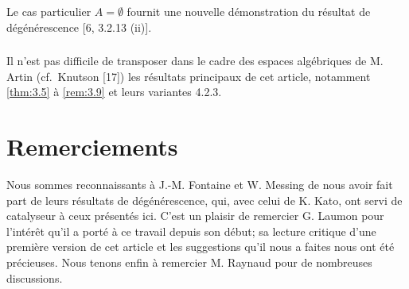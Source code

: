 \documentclass[12pt,a4paper]{article}
\theoremstyle{plain}
\theoremstyle{definition}
\theoremstyle{remark}
\begin{document}
Le cas particulier $A = \emptyset$ fournit une nouvelle d\'emonstration du r\'esultat de d\'eg\'en\'erescence [6, 3.2.13 (ii)].

\subsubsection{}

Il n'est pas difficile de transposer dans le cadre des espaces alg\'ebriques de M. Artin (cf.~Knutson [17]) les r\'esultats principaux de cet article, notamment \ref{thm:3.5} \`a \ref{rem:3.9} et leurs variantes 4.2.3.

\section*{Remerciements}

Nous sommes reconnaissants \`a J.-M. Fontaine et W. Messing de nous avoir fait part de leurs r\'esultats de d\'eg\'en\'erescence, qui, avec celui de K. Kato, ont servi de catalyseur \`a ceux pr\'esent\'es ici. C'est un plaisir de remercier G. Laumon pour l'int\'er\^et qu'il a port\'e \`a ce travail depuis son d\'ebut; sa lecture critique d'une premi\`ere version de cet article et les suggestions qu'il nous a faites nous ont \'et\'e pr\'ecieuses. Nous tenons enfin \`a remercier M. Raynaud pour de nombreuses discussions.
\end{document}
